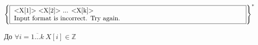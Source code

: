 \\[0.3cm]
\\[0.3cm]
\noindent
\begin{minipage}{0.4\textwidth}
    \(\left\{
        \fbox{
            \parbox{\textwidth} {
                \text{<X[1]> <X[2]> ... <X[k]>}\\
                \text{Input format is incorrect. Try again.}  
            }
        }
    \right\}^{*}\) 
\end{minipage}%
\hfill
\begin{minipage}{0.5\textwidth}
    До \(\forall i = \overline{1 \dots k}\ X[i] \in \mathbb{Z}\) 
\end{minipage}%
\\[0.3cm]

